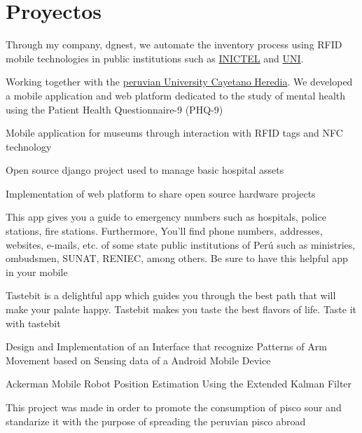 \section{Proyectos}

{Through my company, dgnest, we automate the inventory process using RFID mobile technologies in public institutions such as \href{http://www.inictel-uni.edu.pe/}{INICTEL} and \href{http://en.wikipedia.org/wiki/National_University_of_Engineering}{UNI}.}   

{Working together with the \href{http://www.upch.edu.pe/portal/}{peruvian University Cayetano Heredia}. We developed a mobile application and web platform dedicated to the study of mental health using the Patient Health Questionnaire-9 (PHQ-9)}  

{Mobile application for museums through interaction with RFID tags and NFC technology}  

{Open source django project used to manage basic hospital assets}  

{Implementation of web platform to share open source hardware projects}  

{This app gives you a guide to emergency numbers such as hospitals, police stations, fire stations. Furthermore, You'll find phone numbers, addresses, websites, e-mails, etc. of some state public institutions of Perú such as ministries, ombudsmen, SUNAT, RENIEC, among others. Be sure to have this helpful app in your mobile}  

{Tastebit is a delightful app which guides you through the best path that will make your palate happy. Tastebit makes you taste the best flavors of life. Taste it with tastebit}  

{Design and Implementation of an Interface that recognize Patterns of Arm Movement based on Sensing data of a Android Mobile Device}

{Ackerman Mobile Robot Position Estimation Using the Extended Kalman Filter} 

{This project was made in order to promote the consumption of pisco sour and standarize it with the purpose of spreading the peruvian pisco abroad}